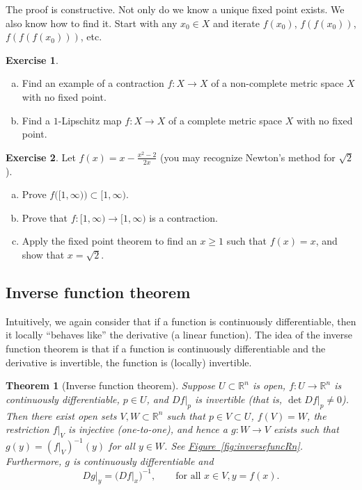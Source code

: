 \documentclass[12pt,openany]{book}
\newcommand{\R}{{\mathbb{R}}}
\newcommand{\myquote}[1]{``#1''}
\theoremstyle{plain}
\newtheorem{thm}{Theorem}[section]
\theoremstyle{remark}
\theoremstyle{definition}
\newenvironment{exbox}{%
    \def\FrameCommand{\vrule width 1pt \relax\hspace{10pt}}%
    \MakeFramed{\advance\hsize-\width\FrameRestore}%
}{%
    \endMakeFramed
}
\newenvironment{exparts}{%
    \leavevmode\begin{enumerate}[a),noitemsep,topsep=0pt,parsep=0pt,partopsep=0pt]
}{%
    \end{enumerate}
}
\theoremstyle{exercise}
\newtheorem{exercise}{Exercise}[section]
\theoremstyle{example}
\newcommand{\figureref}[1]{\hyperref[#1]{Figure~\ref*{#1}}}
\newcommand{\thmref}[1]{\hyperref[#1]{Theorem~\ref*{#1}}}
\begin{document}
The proof is constructive.  Not only do we know 
a unique fixed point exists.  We also know how to find it.  Start with
any $x_0 \in X$ and iterate $f(x_0)$,
$f(f(x_0))$,
$f(f(f(x_0)))$, etc.

\begin{exbox}
\begin{exercise}
\begin{exparts}
\item
Find an example of a contraction $f \colon X \to X$
of a non-complete metric space $X$ with no
fixed point.
\item
Find a $1$-Lipschitz map $f \colon X \to X$ of a complete metric space $X$ with no fixed point.
\end{exparts}
\end{exercise}

\begin{exercise}
Let $f(x) = x-\frac{x^2-2}{2x}$ (you may recognize Newton's method for
$\sqrt{2}$).
\begin{exparts}
\item
Prove $f\bigl([1,\infty)\bigr) \subset [1,\infty)$.
\item
Prove that $f \colon [1,\infty) \to [1,\infty)$ is a contraction.
\item
Apply the fixed point theorem to find an $x \geq 1$ such that
$f(x) = x$, and show that $x = \sqrt{2}$.
\end{exparts}
\end{exercise}
\end{exbox}

\subsection{Inverse function theorem}
\label{subsec:svinvfuncthm}

Intuitively, we again consider that if a function is continuously differentiable, then it
locally \myquote{behaves like} the derivative (a linear function).
The idea of the inverse function theorem is that if a function is
continuously differentiable and the derivative is invertible, the function is
(locally) invertible.

\begin{thm}[Inverse function theorem]
\label{thm:inverse}
Suppose $U \subset \R^n$ is open, 
$f \colon U \to \R^n$ is continuously differentiable, $p \in U$, and $Df|_p$ is invertible
(that is, $\det Df|_p \not=0$).
Then there exist open sets $V, W \subset \R^n$ such that
$p \in V \subset U$, $f(V) = W$, the restriction $f|_V$ is injective (one-to-one),
and hence a $g \colon W \to V$ exists such that
$g(y) = (f|_V)^{-1}(y)$ for all $y \in W$.
See \figureref{fig:inversefuncRn}.
Furthermore, $g$ is continuously differentiable
and 
\begin{equation*}
Dg|_y = {\bigl(Df|_x\bigr)}^{-1}, \qquad \text{for all } x \in V, y = f(x).
\end{equation*}
\end{thm}
\end{document}
